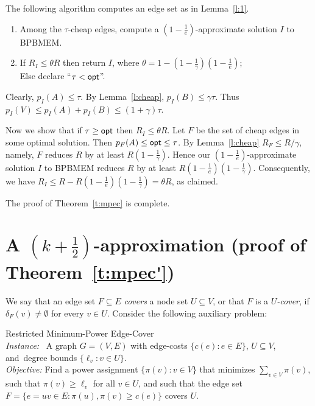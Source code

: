 \documentclass{llncs}
\begin{document}
The following algorithm computes an edge set as in Lemma~\ref{l:1}. 
\begin{enumerate}
\item
Among the $\tau$-cheap edges, compute a $\left(1-\frac{1}{e}\right)$-approximate
solution $I$ to {\sf BPBMEM}.
\item
If $R_I \leq \theta R$ then return $I$, where 
$\theta =1-\left(1-\frac{1}{\gamma}\right)\left(1-\frac{1}{e}\right)$; \\
Else declare ``$\tau<{\sf opt}$''.
\end{enumerate}

\vspace{0.2cm}

Clearly, $p_I(A) \leq \tau$. By Lemma~\ref{l:cheap}, $p_I(B) \leq \gamma \tau$.
Thus $p_I(V) \leq p_I(A)+p_I(B) \leq (1+\gamma) \tau$.

Now we show that if $\tau \geq {\sf opt}$ then $R_I \leq \theta R$.
Let $F$ be the set of cheap edges in some optimal solution. 
Then $p_F(A) \leq {\sf opt} \leq \tau$. 
By Lemma~\ref{l:cheap} $R_F \leq R/\gamma$, namely, 
$F$ reduces $R$ by at least $R\left(1-\frac{1}{\gamma}\right)$.
Hence our $\left(1-\frac{1}{e} \right)$-approximate solution $I$ to {\sf BPBMEM}
reduces $R$ by at least $R\left(1-\frac{1}{e}\right)\left(1-\frac{1}{\gamma}\right)$.
Consequently, we have 
$R_I \leq R-R\left(1-\frac{1}{e}\right)\left(1-\frac{1}{\gamma}\right)=\theta R$, 
as claimed.

The proof of Theorem~\ref{t:mpec} is complete.

\section{A $\left(k+\frac{1}{2}\right)$-approximation (proof of Theorem~\ref{t:mpec'})}

We say that an edge set $F \subseteq E$ {\em covers} a node set $U \subseteq V$, 
or that $F$ is a {\em $U$-cover}, if $\delta_F(v)\neq \emptyset$ for every $v \in U$. 
Consider the following auxiliary problem:

\vspace{0.2cm}

\noindent
{\sf Restricted Minimum-Power Edge-Cover}  \\
{\em Instance:} \ 
A graph $G=(V,E)$ with edge-costs $\{c(e): e \in E\}$, $U \subseteq V$, and~degree 
\hphantom{\em Instance: } 
bounds $\{\ell_v:v \in U\}$. \\
{\em Objective:} 
Find a power assignment $\{\pi(v):v \in V\}$ that minimizes $\sum_{v \in V} \pi(v)$,
\hphantom{\em Objective:}
such that $\pi(v) \geq \ell_v$ for all $v \in U$, and such that the edge set 
\hphantom{\em Objective:}~$F=\{e=uv\in E: \pi(u),\pi(v)\geq c(e)\}$ covers $U$.
\end{document}
